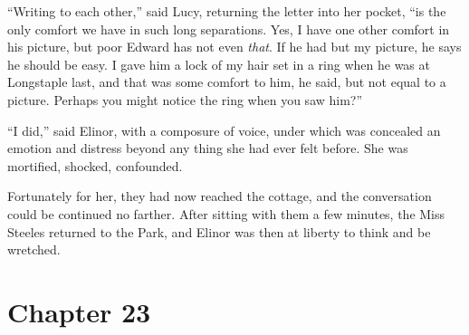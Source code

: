 ``Writing to each other,'' said Lucy, returning the
letter into her pocket, ``is the only comfort we have
in such long separations.  Yes, I have one other comfort
in his picture, but poor Edward has not even \emph{that}.
If he had but my picture, he says he should be easy.
I gave him a lock of my hair set in a ring when he was at
Longstaple last, and that was some comfort to him, he said,
but not equal to a picture.  Perhaps you might notice
the ring when you saw him?''

``I did,'' said Elinor, with a composure of voice,
under which was concealed an emotion and distress beyond
any thing she had ever felt before.  She was mortified,
shocked, confounded.

Fortunately for her, they had now reached the cottage,
and the conversation could be continued no farther.
After sitting with them a few minutes, the Miss Steeles
returned to the Park, and Elinor was then at liberty
to think and be wretched.










\chapter{Chapter 23}


